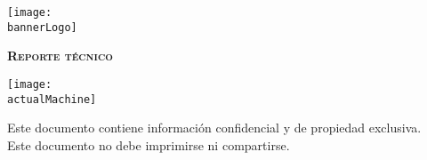\begin{titlepage}
    \centering
    \texttt{[image: \\bannerLogo]}\par\vspace{0.5cm}
    {\scshape\LARGE \textbf{Reporte técnico}}\par\vspace{0.3cm}
    {\Huge \bfseries \textcolor{greenBanner}{\productToTestName}}\par\vspace{1cm}
    \vfill
    \vfill
    \texttt{[image: \\actualMachine]}\par\vspace{1cm}
    \vfill
    \begin{tcolorbox}[colback=red!5!white,colframe=red!75!black]
        \centering
        Este documento contiene información confidencial y de propiedad exclusiva.\\
        Este documento no debe imprimirse ni compartirse.
    \end{tcolorbox}
    \vfill
    {\large \startDate}\par
    \vfill
    \clearpage
\end{titlepage}